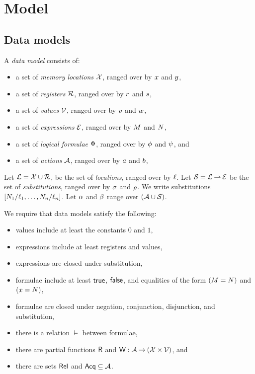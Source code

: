 \section{Model}
\label{sec:model}
\subsection{Data models}
\label{sec:preliminaries}

A \emph{data model} consists of:
\begin{itemize}
\item a set of \emph{memory locations} $\mathcal{X}$, ranged over by
  $x$ and $y$,
\item a set of \emph{registers} $\mathcal{R}$, ranged over by
  $r$ and $s$,
\item a set of \emph{values} $\mathcal{V}$, ranged over by
  $v$ and $w$,
\item a set of \emph{expressions} $\mathcal{E}$, ranged over by
  $M$ and $N$,
\item a set of \emph{logical formulae} $\Phi$, ranged over by
  $\phi$ and $\psi$, and
\item a set of \emph{actions} $\mathcal{A}$, ranged over by $a$ and $b$,
\end{itemize}

Let $\mathcal{L}=\mathcal{X}\cup\mathcal{R}$, be the set of \emph{locations}, ranged over by
$\ell$.
Let $\mathcal{S}=\mathcal{L}\mathbin\rightharpoonup\mathcal{E}$ be the set of \emph{substitutions}, ranged over
by $\sigma$ and $\rho$.
We write substitutions
$[N_1/\ell_1,\ldots, N_n/\ell_n]$.
Let $\alpha$ and $\beta$ range over $(\mathcal{A}\cup\mathcal{S})$.

We require that data models satisfy the following:
\begin{itemize}
\item values include at least the constants $0$ and $1$,
\item expressions include at least registers and values,
\item expressions are closed under substitution,
\item formulae include at least $\mathsf{true}$, $\mathsf{false}$, and equalities of the form $(M=N)$ and $(x=N)$,
\item formulae are closed under negation, conjunction, disjunction, and substitution,
\item there is a relation $\vDash$ between formulae, 
\item there are partial functions $\mathsf{R}$ and $\mathsf{W}: \mathcal{A} \mathbin\rightarrow (\mathcal{X}
  \times \mathcal{V})$, and
\item there are sets $\mathsf{Rel}$ and $\mathsf{Acq} \subseteq\mathcal{A}$.
\end{itemize}

